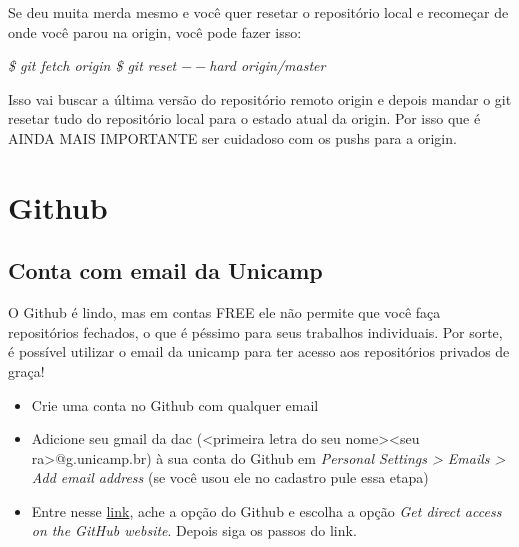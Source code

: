 \documentclass[12pt]{article}
\begin{document}
\begin{doublespacing}
Se deu muita merda mesmo e você quer resetar o repositório local e recomeçar de onde você parou na origin, você pode fazer isso: 
\begin{flushleft}
\textit{\$ git fetch origin \newline
\$ git reset $--$hard origin/master}
\end{flushleft}

Isso vai buscar a última versão do repositório remoto origin e depois mandar o git resetar tudo do repositório local para o estado atual da origin. Por isso que é AINDA MAIS IMPORTANTE ser cuidadoso com os pushs para a origin.

\section{Github}
\subsection{Conta com email da Unicamp}
O Github é lindo, mas em contas FREE ele não permite que você faça repositórios fechados, o que é péssimo para seus trabalhos individuais. Por sorte, é possível utilizar o email da unicamp para ter acesso aos repositórios privados de graça!
\begin{itemize}
\item Crie uma conta no Github com qualquer email
\item Adicione seu gmail da dac (<primeira letra do seu nome><seu ra>@g.unicamp.br) à sua conta do Github em \textit{Personal Settings > Emails > Add email address } (se você usou ele no cadastro pule essa etapa) 
\item Entre nesse \href{https://education.github.com/pack/offers}{link}, ache a opção do Github e escolha a opção \textit{Get direct access on the GitHub website}. Depois siga os passos do link.
\end{itemize}


\end{doublespacing}
\end{document}
